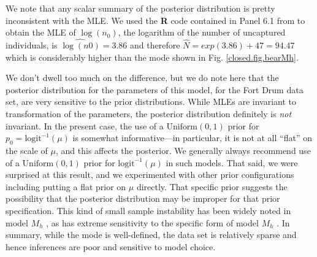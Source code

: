 We note that any scalar summary of the posterior distribution is
pretty inconsistent with the MLE. 
We used 
the {\bf R} code contained in Panel 6.1 from
\citet{royle_dorazio:2008} to obtain the 
MLE of $\log(n_{0})$, the logarithm of the number of uncaptured
individuals, is $\widehat{\log(n0)} = 3.86$ and therefore $\hat{N} =
exp(3.86)+47 = 94.47$ which is considerably higher than the mode
shown in Fig. \ref{closed.fig.bearMh}.

We don't dwell too much on the difference, but we do note here that
the posterior distribution for the parameters of this model, for the
Fort Drum data set, are 
very sensitive to the prior distributions. While MLEs are invariant to
transformation of the parameters, the posterior distribution
definitely is {\it not} invariant. In the present case, the use of a
$\mbox{Uniform}(0,1)$ prior for $p_{0} = \mbox{logit}^{-1}(\mu)$ is somewhat
informative---in particular, it is not at all ``flat'' on the scale
of $\mu$, and this affects the posterior.  We generally always
recommend use of a $\mbox{Uniform}(0,1)$ prior for $\mbox{logit}^{-1}(\mu)$ in such
models. That said, we were surprised at this result, and we
experimented with other prior configurations including putting a flat
prior on $\mu$ directly. That specific prior suggests the possibility
that the posterior distribution may be improper for that prior
specification. This kind of small sample instability has been widely
noted in model $M_h$ \citep{fienberg_etal:1999, dorazio_royle:2003},
as has extreme sensitivity to the specific form of model $M_{h}$ \citep{link:2003}.
In summary, while the mode is well-defined, the data set is relatively
sparse and hence inferences are poor and sensitive to model choice.








